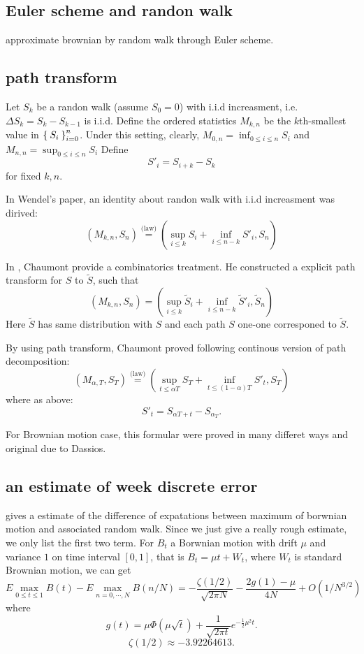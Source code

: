 \documentclass[11pt]{book}
\def\eqlaw{{\stackrel{\text{(law)}}{=}}}
\def\tS{{\widetilde{S}}}
\begin{document}
\subsection{Euler scheme and randon walk}
approximate brownian by random walk through Euler scheme.


\subsection{path transform}
Let $S_k$ be a randon walk (assume $S_0=0$) 
with i.i.d increasment, i.e. 
$\Delta S_k = S_k -  S_{k-1}$ is i.i.d. 
Define the ordered statistics $M_{k,n}$ be the $k$th-smallest value in
$\Set{S_i}_{i=0}^n$. 
Under this setting, clearly, $M_{0,n} = \inf_{0\leq i\leq n}S_i$
and $M_{n,n} = \sup_{0\leq i\leq n}S_i$
Define 
\[S'_i = S_{i+k}-S_k\] 
for fixed $k, n$.  

In Wendel's paper\cite{Wendel1960}, an identity about randon walk with 
i.i.d increasment was dirived:
\begin{equation}\label{eq:dpathdec}
(M_{k,n}, S_n) \eqlaw (\sup_{i\leq k} S_i +\inf_{i\leq n-k} S'_i, S_n)
\end{equation}

In 
\cite{Chaumont1999}, Chaumont provide a combinatorics treatment. 
He constructed a explicit path transform for $S$ to $\tS$, such that 
\[
(M_{k,n}, S_n) = (\sup_{i\leq k} \tS_i+\inf_{i\leq n-k} \tS'_i, \tS_n)
\]
Here $\tS$ has same distribution with $S$ and each path $S$
 one-one corresponed to $\tS$.

By using path transform, Chaumont proved 
following continous version of path decomposition:
\begin{equation}\label{eq:cpathdec}
(M_{\alpha,T}, S_T) \eqlaw (\sup_{t\leq \alpha{T}} S_T +\inf_{t \leq (1-\alpha)T} S'_t, S_T)
\end{equation}
where as above:
\[
S'_t = S_{\alpha T+t} - S_{\alpha_T}.
\]

For Brownian motion case, this formular were proved in many differet ways
and original due to Dassios\cite{Dassios1995}. 

\subsection{an estimate of week discrete error}
\cite{Janssen2008} gives a estimate of the difference of  expatations 
between maximum of borwnian motion and associated random walk.  
Since we just give a really rough estimate, we only list the first two term. 
For $B_t$ a Borwnian motion with drift $\mu$ and variance $1$ on time interval $[0,1]$, that is $B_t = \mu t + W_t$, where $W_t$ is standard Brownian motion, we can get
\begin{equation}\label{eq:est1}
E\max_{0\leq t \leq 1} B(t) - E\max_{n=0,\cdots, N}B(n/N) 
= -\frac{\zeta(1/2)}{\sqrt{2\pi N}}-\frac{2g(1)-\mu}{4N} + O(1/N^{3/2})
\end{equation}
where 
\[
g(t) = \mu \Phi(\mu \sqrt{t}) + \frac{1}{\sqrt{2\pi t}} e^{-\frac{1}{2}\mu^2 t}.
\]
\[
\zeta(1/2) \approx -3.92264613.
\]
\end{document}
